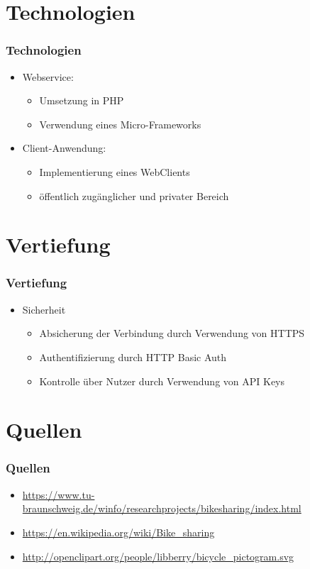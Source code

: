 \section{Technologien}
\begin{frame}
	\frametitle*{Technologien}
	\begin{itemize}
		\item Webservice:
			\begin{itemize}
				\item Umsetzung in PHP
				\item Verwendung eines Micro-Frameworks
			\end{itemize}
			
		\item Client-Anwendung:	
			\begin{itemize}
				\item Implementierung eines WebClients
				\item öffentlich zugänglicher und privater Bereich
			\end{itemize}
	\end{itemize}
\end{frame}

\section{Vertiefung}
\begin{frame}
	\frametitle*{Vertiefung}
	\begin{itemize}
		\item Sicherheit
			\begin{itemize}
				\item Absicherung der Verbindung durch Verwendung von HTTPS
				\item Authentifizierung durch HTTP Basic Auth
				\item Kontrolle über Nutzer durch Verwendung von API Keys
			\end{itemize}
	\end{itemize}
\end{frame}

\section{Quellen}
\begin{frame}
	\frametitle*{Quellen}
	\begin{itemize}
		\item \url{https://www.tu-braunschweig.de/winfo/researchprojects/bikesharing/index.html}
		\item \url{https://en.wikipedia.org/wiki/Bike_sharing}
		\item \url{http://openclipart.org/people/libberry/bicycle_pictogram.svg}
	\end{itemize}
\end{frame}
